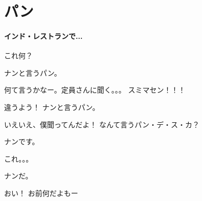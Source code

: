\chapter*{パン}

\subsubsection*{インド・レストランで...}

\akun これ何？

\bkun ナンと言うパン。

\akun 何て言うかなー。定員さんに聞く。。。 スミマセン！！！

\bkun 違うよう！ ナンと言うパン。

\akun いえいえ、僕聞ってんだよ！ なんて言うパン・デ・ス・カ？

\bkun ナンです。

\akun これ。。。

\bkun ナンだ。

\akun おい！ お前何だよもー


